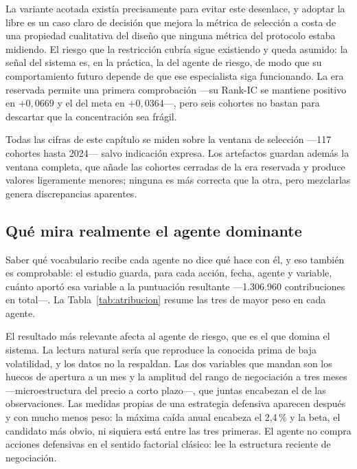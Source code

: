 La variante acotada existía precisamente para evitar este desenlace, y adoptar la libre es un caso
claro de decisión que mejora la métrica de selección a costa de una propiedad cualitativa del
diseño que ninguna métrica del protocolo estaba midiendo. El riesgo que la restricción cubría sigue
existiendo y queda asumido: la señal del sistema es, en la práctica, la del agente de riesgo, de
modo que su comportamiento futuro depende de que ese especialista siga funcionando. La era reservada
permite una primera comprobación ---su Rank-IC se mantiene positivo en $+0{,}0669$ y el del meta en
$+0{,}0364$---, pero seis cohortes no bastan para descartar que la concentración sea frágil.

Todas las cifras de este capítulo se miden sobre la ventana de selección ---117 cohortes hasta
2024--- salvo indicación expresa. Los artefactos guardan además la ventana completa, que añade las
cohortes cerradas de la era reservada y produce valores ligeramente menores; ninguna es más correcta
que la otra, pero mezclarlas genera discrepancias aparentes.

\subsection{Qué mira realmente el agente dominante}
\label{sec:atribucion-local}

Saber qué vocabulario recibe cada agente no dice qué hace con él, y eso también es comprobable: el
estudio guarda, para cada acción, fecha, agente y variable, cuánto aportó esa variable a la
puntuación resultante ---1.306.960 contribuciones en total---. La Tabla~\ref{tab:atribucion} resume
las tres de mayor peso en cada agente.

\begin{table}[htbp]
  \centering
  \small
  \caption{Variables que más contribuyen a la puntuación de cada agente.}
  \label{tab:atribucion}
  
  \caption*{«Contrib. media» es la magnitud media de la contribución local; «Encabeza», la fracción
  de observaciones en las que esa variable fue la primera por importancia. No se reporta el signo
  medio porque se cancela entre acciones y no admite lectura direccional.}
\end{table}

El resultado más relevante afecta al agente de riesgo, que es el que domina el sistema. La lectura
natural sería que reproduce la conocida prima de baja volatilidad, y los datos no la
respaldan. Las dos variables que mandan son los huecos de apertura a un mes y la amplitud del rango
de negociación a tres meses ---microestructura del precio a corto plazo---, que juntas encabezan el
\DosVariablesRisk{} de las observaciones. Las medidas propias de una estrategia defensiva aparecen
después y con mucho menos peso: la máxima caída anual encabeza el 2,4\,\% y la beta, el candidato
más obvio, ni siquiera está entre las tres primeras. El agente no compra acciones defensivas en el
sentido factorial clásico: lee la estructura reciente de negociación.

